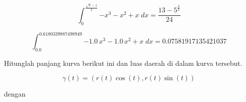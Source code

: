 \documentclass[12pt,arial,letterpaper]{book}
\begin{document}
\begin{eulernootebook}
\begin{eulercomment}
\begin{eulercomment}
\begin{eulernootebook}
\begin{eulercomment}
\begin{eulercomment}
\begin{eulercomment}
\begin{eulercomment}
\begin{eulercomment}
\begin{eulercomment}
\begin{eulernotebook}
\begin{eulercomment}
\begin{eulercomment}
\begin{eulercomment}
\begin{eulercomment}
\begin{eulercomment}
\begin{eulercomment}
\begin{eulercomment}
\begin{eulercomment}
\begin{eulercomment}
\begin{eulercomment}
\begin{eulerformula}
\[\int_{0}^{\frac{\sqrt{5}-1}{2}}{-x^3-x^2+x\;dx}=\frac{13-5^{\frac{3
 }{2}}}{24}
\]
\end{eulerformula}
\begin{eulerformula}
\[
\int_{0.0}^{0.6180339887498949}{-1.0\,x^3-1.0\,x^2+x\;dx}=
 0.07581917135421037
\]
\end{eulerformula}
\begin{eulercomment}
\begin{eulercomment}
\begin{eulercomment}
Hitunglah panjang kurva berikut ini dan luas daerah di dalam kurva
tersebut.

\end{eulercomment}
\begin{eulerformula}
\[
\gamma(t)=(r(t)\cos(t),r(t)\sin(t))
\]
\end{eulerformula}
\begin{eulercomment}
dengan


\end{eulercomment}
\end{eulercomment}
\end{eulercomment}
\end{eulercomment}
\end{eulercomment}
\end{eulercomment}
\end{eulercomment}
\end{eulercomment}
\end{eulercomment}
\end{eulercomment}
\end{eulercomment}
\end{eulercomment}
\end{eulercomment}
\end{eulernotebook}
\end{eulercomment}
\end{eulercomment}
\end{eulercomment}
\end{eulercomment}
\end{eulercomment}
\end{eulercomment}
\end{eulernootebook}
\end{eulercomment}
\end{eulercomment}
\end{eulernootebook}
\end{document}

